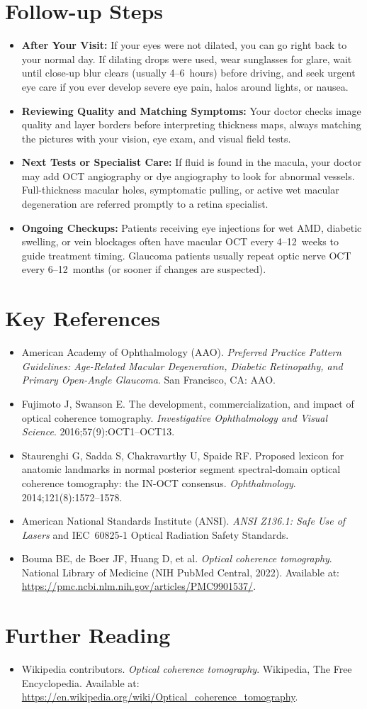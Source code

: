 \section{Follow-up Steps}
\begin{itemize}
\item \textbf{After Your Visit:} If your eyes were not dilated, you can go right back to your normal day. If dilating drops were used, wear sunglasses for glare, wait until close-up blur clears (usually 4--6~hours) before driving, and seek urgent eye care if you ever develop severe eye pain, halos around lights, or nausea.
\item \textbf{Reviewing Quality and Matching Symptoms:} Your doctor checks image quality and layer borders before interpreting thickness maps, always matching the pictures with your vision, eye exam, and visual field tests.
\item \textbf{Next Tests or Specialist Care:} If fluid is found in the macula, your doctor may add OCT angiography or dye angiography to look for abnormal vessels. Full-thickness macular holes, symptomatic pulling, or active wet macular degeneration are referred promptly to a retina specialist.
\item \textbf{Ongoing Checkups:} Patients receiving eye injections for wet AMD, diabetic swelling, or vein blockages often have macular OCT every 4--12~weeks to guide treatment timing. Glaucoma patients usually repeat optic nerve OCT every 6--12~months (or sooner if changes are suspected).
\end{itemize}

\section{Key References}
\begin{itemize}
\item American Academy of Ophthalmology (AAO). \textit{Preferred Practice Pattern Guidelines: Age-Related Macular Degeneration, Diabetic Retinopathy, and Primary Open-Angle Glaucoma}. San Francisco, CA: AAO.
\item Fujimoto J, Swanson E. The development, commercialization, and impact of optical coherence tomography. \textit{Investigative Ophthalmology and Visual Science}. 2016;57(9):OCT1--OCT13.
\item Staurenghi G, Sadda S, Chakravarthy U, Spaide RF. Proposed lexicon for anatomic landmarks in normal posterior segment spectral-domain optical coherence tomography: the IN-OCT consensus. \textit{Ophthalmology}. 2014;121(8):1572--1578.
\item American National Standards Institute (ANSI). \textit{ANSI Z136.1: Safe Use of Lasers} and IEC~60825-1 Optical Radiation Safety Standards.
\item Bouma BE, de Boer JF, Huang D, et al. \textit{Optical coherence tomography}. National Library of Medicine (NIH PubMed Central, 2022). Available at: \url{https://pmc.ncbi.nlm.nih.gov/articles/PMC9901537/}.
\end{itemize}

\section{Further Reading}
\begin{itemize}
  \item Wikipedia contributors. \textit{Optical coherence tomography}. Wikipedia, The Free Encyclopedia. Available at: \url{https://en.wikipedia.org/wiki/Optical_coherence_tomography}.
\end{itemize}
